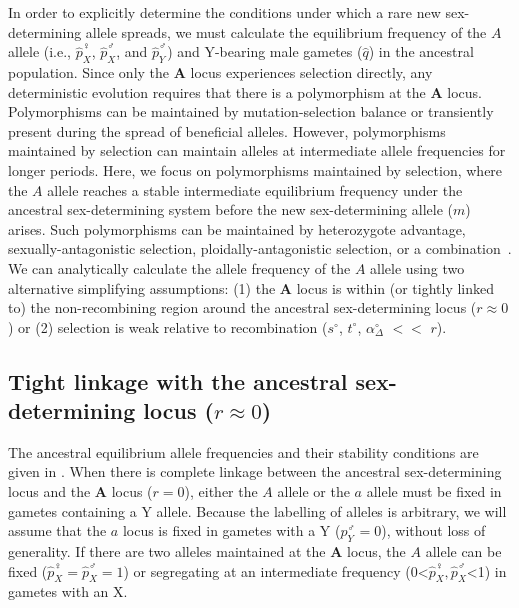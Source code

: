 \documentclass[10pt,letterpaper]{article}
\begin{document}
In order to explicitly determine the conditions under which a rare new sex-determining allele spreads, we must calculate the equilibrium frequency of the $A$ allele (i.e., $\hat{p}^\female_X$, $\hat{p}^\male_X$, and $\hat{p}^\male_Y$) and Y-bearing male gametes ($\hat{q}$) in the ancestral population. 
Since only the $\mathbf{A}$ locus experiences selection directly, any deterministic evolution requires that there is a polymorphism at the $\mathbf{A}$ locus. 
Polymorphisms can be maintained by mutation-selection balance or transiently present during the spread of beneficial alleles. 
However, polymorphisms maintained by selection can maintain alleles at intermediate allele frequencies for longer periods. 
Here, we focus on polymorphisms maintained by selection, where the $A$ allele reaches a stable intermediate equilibrium frequency under the ancestral sex-determining system before the new sex-determining allele ($m$) arises. 
Such polymorphisms can be maintained by heterozygote advantage, sexually-antagonistic selection, ploidally-antagonistic selection, or a combination~\cite{Immler:2012tl}.
We can analytically calculate the allele frequency of the $A$ allele using two alternative simplifying assumptions: 
(1) the $\mathbf{A}$ locus is within (or tightly linked to) the non-recombining region around the ancestral sex-determining locus ($r \approx 0$) or (2) selection is weak relative to recombination ($s^\circ$, $t^\circ$, $\alpha_{\Delta}^\circ$ $<<$ $r$). 

\subsection*{Tight linkage with the ancestral sex-determining locus ($r \approx 0$)}

The ancestral equilibrium allele frequencies and their stability conditions are given in . 
When there is complete linkage between the ancestral sex-determining locus and the $\mathbf{A}$ locus ($r=0$), either the $A$ allele or the $a$ allele must be fixed in gametes containing a Y allele. 
Because the labelling of alleles is arbitrary, we will assume that the $a$ locus is fixed in gametes with a Y ($p^\male_Y=0$), without loss of generality. 
If there are two alleles maintained at the $\mathbf{A}$ locus, the $A$ allele can be fixed ($\hat{p}^\female_X=\hat{p}^\male_X=1$) or segregating at an intermediate frequency (0<$\hat{p}^\female_X, \hat{p}^\male_X$<1) in gametes with an X. 
\end{document}
